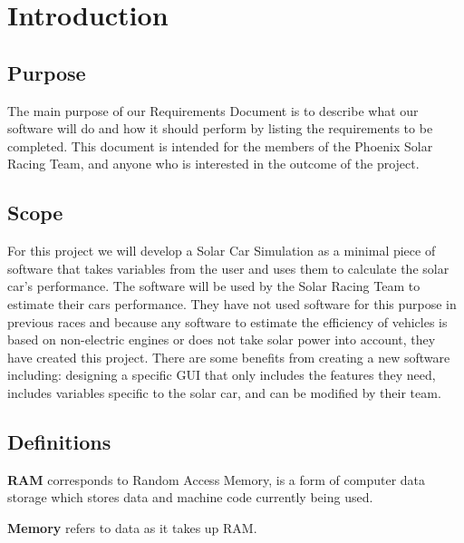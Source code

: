 \documentclass[onecolumn, draftclsnofoot,10pt, compsoc]{IEEEtran}
\begin{document}
\begin{singlespace}
\begin{titlepage}
\begin{singlespace}
\begin{abstract}
        \end{abstract}     
    \end{singlespace}
\end{titlepage}
\newpage
{}
\tableofcontents
\clearpage

\section{Introduction}
    
    \subsection{Purpose}
    The main purpose of our Requirements Document is to describe what our software will do and how it should perform by listing the requirements to be completed.
    This document is intended for the members of the Phoenix Solar Racing Team, and anyone who is interested in the outcome of the project.
    
    \subsection{Scope}
    For this project we will develop a Solar Car Simulation as a minimal piece of software that takes variables from the user and uses them to calculate the solar car's performance.
    The software will be used by the Solar Racing Team to estimate their cars performance. 
    They have not used software for this purpose in previous races and because any software to estimate the efficiency of vehicles is based on non-electric engines or does not take solar power into account, they have created this project. There are some benefits from creating a new software including: designing a specific GUI that only includes the features they need, includes variables specific to the solar car, and can be modified by their team.
    
    \subsection{Definitions}
    \textbf{RAM} corresponds to Random Access Memory, is a form of computer data storage which stores data and machine code currently being used.
    
    \vspace{.1cm}
    \noindent \textbf{Memory} refers to data as it takes up RAM.
    

\end{singlespace}
\end{document}
